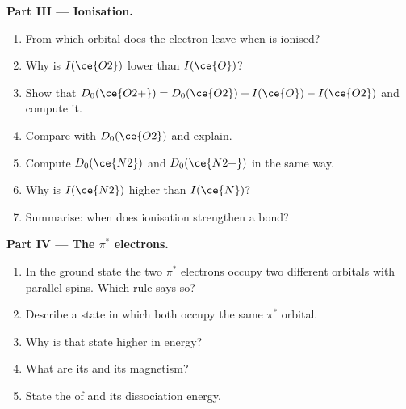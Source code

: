 \begin{problem}
\medskip
\noindent\textbf{Part III --- Ionisation.}
\begin{enumerate}[resume]
  \item From which orbital does the electron leave when  is ionised?
  \item Why is $I(\ce{O2})$ lower than $I(\ce{O})$?
  \item Show that $D_0(\ce{O2+}) = D_0(\ce{O2}) + I(\ce{O}) - I(\ce{O2})$ and compute it.
  \item Compare with $D_0(\ce{O2})$ and explain.
  \item Compute $D_0(\ce{N2})$ and $D_0(\ce{N2+})$ in the same way.
  \item Why is $I(\ce{N2})$ higher than $I(\ce{N})$?
  \item Summarise: when does ionisation strengthen a bond?
\end{enumerate}

\medskip
\noindent\textbf{Part IV --- The $\pi^*$ electrons.}
\begin{enumerate}[resume]
  \item In the ground state the two $\pi^*$ electrons occupy two different orbitals with
        parallel spins. Which rule says so?
  \item Describe a state in which both occupy the same $\pi^*$ orbital.
  \item Why is that state higher in energy?
  \item What are its  and its magnetism?
  \item State the  of  and its dissociation energy.
\end{enumerate}
\end{problem}
